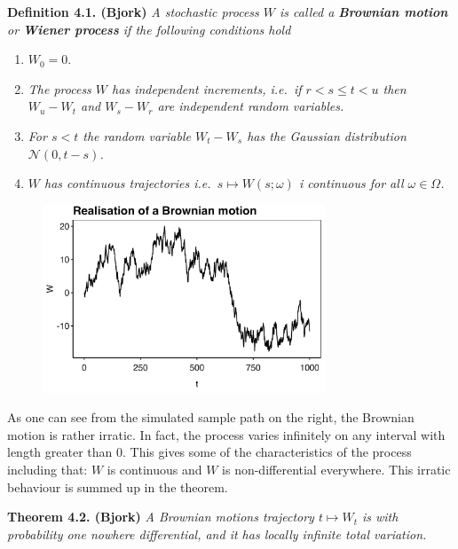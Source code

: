 \documentclass[
]{book}
\providecommand{\tightlist}{%
  \setlength{\itemsep}{0pt}\setlength{\parskip}{0pt}}
\begin{document}
\textbf{Definition 4.1. (Bjork)} \emph{A stochastic process \(W\) is called a \textbf{Brownian motion} or \textbf{Wiener process} if the following conditions hold}

\begin{enumerate}
\def\labelenumi{\arabic{enumi}.}
\tightlist
\item
  \(W_0=0\).
\item
  \emph{The process \(W\) has independent increments, i.e.~if \(r<s\le t< u\) then \(W_u-W_t\) and \(W_s-W_r\) are independent random variables.}
\item
  \emph{For \(s<t\) the random variable \(W_t-W_s\) has the Gaussian distribution \(\mathcal{N}(0,t-s)\).}
\item
  \emph{\(W\) has continuous trajectories i.e.~\(s\mapsto W(s;\omega)\) i continuous for all \(\omega \in\Omega\).}
\end{enumerate}

\begin{figure}[H]
  \begin{center}
    \includegraphics[width=0.75\textwidth]{figures/BM_sim.png}
  \end{center}
\end{figure}

As one can see from the simulated sample path on the right, the Brownian motion is rather irratic. In fact, the process varies infinitely on any interval with length greater than 0. This gives some of the characteristics of the process including that: \(W\) is continuous and \(W\) is non-differential everywhere. This irratic behaviour is summed up in the theorem.

\textbf{Theorem 4.2. (Bjork)} \emph{A Brownian motions trajectory \(t\mapsto W_t\) is with probability one nowhere differential, and it has locally infinite total variation.}
\end{document}
